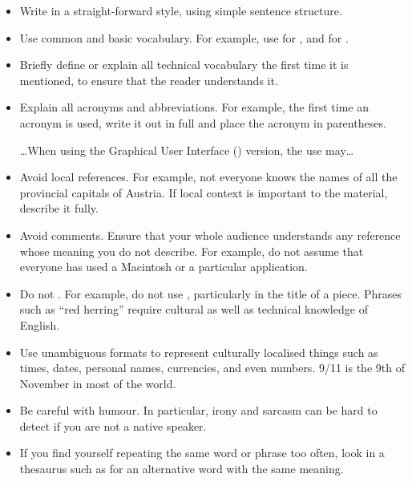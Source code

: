 \begin{itemize}
\item Write in a straight-forward style, using simple sentence
  structure.

\item Use common and basic vocabulary. For example, use 
  for , and  for .

\item Briefly define or explain all technical vocabulary the first
  time it is mentioned, to ensure that the reader understands it.

\item Explain all acronyms and abbreviations. For example, the first
  time an acronym is used, write it out in full and place the acronym
  in parentheses.

{\ldots When using the Graphical User Interface () version, the use may\ldots}


\item Avoid local references. For example, not everyone knows the
  names of all the provincial capitals of Austria. If local context is
  important to the material, describe it fully.

\item Avoid  comments. Ensure that your whole audience
  understands any reference whose meaning you do not describe. For
  example, do not assume that everyone has used a Macintosh or a
  particular application.

\item Do not . For example, do not use ,
  particularly in the title of a piece. Phrases such as ``red
  herring'' require cultural as well as technical knowledge of
  English.

\item Use unambiguous formats to represent culturally localised things
  such as times, dates, personal names, currencies, and even
  numbers. 9/11 is the 9th of November in most of the world.

\item Be careful with humour. In particular, irony and sarcasm can be
  hard to detect if you are not a native speaker.

\item If you find yourself repeating the same word or phrase too often,
  look in a thesaurus such as \textcite{Roget,RogetII} for an
  alternative word with the same meaning.
\end{itemize}


